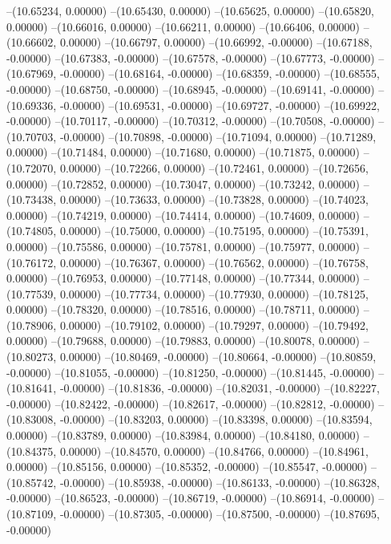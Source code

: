--(10.65234, 0.00000)
--(10.65430, 0.00000)
--(10.65625, 0.00000)
--(10.65820, 0.00000)
--(10.66016, 0.00000)
--(10.66211, 0.00000)
--(10.66406, 0.00000)
--(10.66602, 0.00000)
--(10.66797, 0.00000)
--(10.66992, -0.00000)
--(10.67188, -0.00000)
--(10.67383, -0.00000)
--(10.67578, -0.00000)
--(10.67773, -0.00000)
--(10.67969, -0.00000)
--(10.68164, -0.00000)
--(10.68359, -0.00000)
--(10.68555, -0.00000)
--(10.68750, -0.00000)
--(10.68945, -0.00000)
--(10.69141, -0.00000)
--(10.69336, -0.00000)
--(10.69531, -0.00000)
--(10.69727, -0.00000)
--(10.69922, -0.00000)
--(10.70117, -0.00000)
--(10.70312, -0.00000)
--(10.70508, -0.00000)
--(10.70703, -0.00000)
--(10.70898, -0.00000)
--(10.71094, 0.00000)
--(10.71289, 0.00000)
--(10.71484, 0.00000)
--(10.71680, 0.00000)
--(10.71875, 0.00000)
--(10.72070, 0.00000)
--(10.72266, 0.00000)
--(10.72461, 0.00000)
--(10.72656, 0.00000)
--(10.72852, 0.00000)
--(10.73047, 0.00000)
--(10.73242, 0.00000)
--(10.73438, 0.00000)
--(10.73633, 0.00000)
--(10.73828, 0.00000)
--(10.74023, 0.00000)
--(10.74219, 0.00000)
--(10.74414, 0.00000)
--(10.74609, 0.00000)
--(10.74805, 0.00000)
--(10.75000, 0.00000)
--(10.75195, 0.00000)
--(10.75391, 0.00000)
--(10.75586, 0.00000)
--(10.75781, 0.00000)
--(10.75977, 0.00000)
--(10.76172, 0.00000)
--(10.76367, 0.00000)
--(10.76562, 0.00000)
--(10.76758, 0.00000)
--(10.76953, 0.00000)
--(10.77148, 0.00000)
--(10.77344, 0.00000)
--(10.77539, 0.00000)
--(10.77734, 0.00000)
--(10.77930, 0.00000)
--(10.78125, 0.00000)
--(10.78320, 0.00000)
--(10.78516, 0.00000)
--(10.78711, 0.00000)
--(10.78906, 0.00000)
--(10.79102, 0.00000)
--(10.79297, 0.00000)
--(10.79492, 0.00000)
--(10.79688, 0.00000)
--(10.79883, 0.00000)
--(10.80078, 0.00000)
--(10.80273, 0.00000)
--(10.80469, -0.00000)
--(10.80664, -0.00000)
--(10.80859, -0.00000)
--(10.81055, -0.00000)
--(10.81250, -0.00000)
--(10.81445, -0.00000)
--(10.81641, -0.00000)
--(10.81836, -0.00000)
--(10.82031, -0.00000)
--(10.82227, -0.00000)
--(10.82422, -0.00000)
--(10.82617, -0.00000)
--(10.82812, -0.00000)
--(10.83008, -0.00000)
--(10.83203, 0.00000)
--(10.83398, 0.00000)
--(10.83594, 0.00000)
--(10.83789, 0.00000)
--(10.83984, 0.00000)
--(10.84180, 0.00000)
--(10.84375, 0.00000)
--(10.84570, 0.00000)
--(10.84766, 0.00000)
--(10.84961, 0.00000)
--(10.85156, 0.00000)
--(10.85352, -0.00000)
--(10.85547, -0.00000)
--(10.85742, -0.00000)
--(10.85938, -0.00000)
--(10.86133, -0.00000)
--(10.86328, -0.00000)
--(10.86523, -0.00000)
--(10.86719, -0.00000)
--(10.86914, -0.00000)
--(10.87109, -0.00000)
--(10.87305, -0.00000)
--(10.87500, -0.00000)
--(10.87695, -0.00000)
